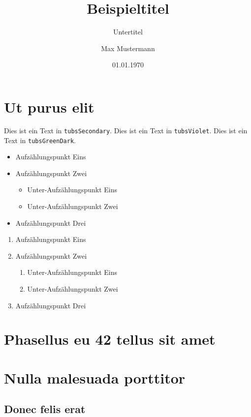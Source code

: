 \documentclass[%
  a4paper,%
  11pt,%
  blue,%
  ]{tubsbook}
\title{Beispieltitel}
\subtitle{Untertitel}
\author{Max Mustermann}
\date{01.01.1970}
\begin{document}
\maketitle[image,logo=right]%
\makebackpage[trisec]%

\tableofcontents


\chapter{Ut purus elit}

\textcolor{tubsSecondary}{Dies ist ein Text in \texttt{tubsSecondary}.}
\textcolor{tubsViolet}{Dies ist ein Text in \texttt{tubsViolet}.}
\textcolor{tubsGreenDark}{Dies ist ein Text in \texttt{tubsGreenDark}.}\bigskip

\lipsum[1]

\begin{itemize}
  \item Aufzählungspunkt Eins
  \item Aufzählungspunkt Zwei
    \begin{itemize}
      \item Unter-Aufzählungspunkt Eins
      \item Unter-Aufzählungspunkt Zwei
    \end{itemize}
  \item Aufzählungspunkt Drei
\end{itemize}

\lipsum[9-12]

\begin{enumerate}
  \item Aufzählungspunkt Eins
  \item Aufzählungspunkt Zwei
    \begin{enumerate}
      \item Unter-Aufzählungspunkt Eins
      \item Unter-Aufzählungspunkt Zwei
    \end{enumerate}
  \item Aufzählungspunkt Drei
\end{enumerate}


\lipsum[13-15]

\chapter{Phasellus eu 42 tellus sit amet}

\lipsum[2-5]

\chapter{Nulla malesuada porttitor}

\lipsum[1-3]

\section{Donec felis erat}

\lipsum[4-7]
\end{document}
